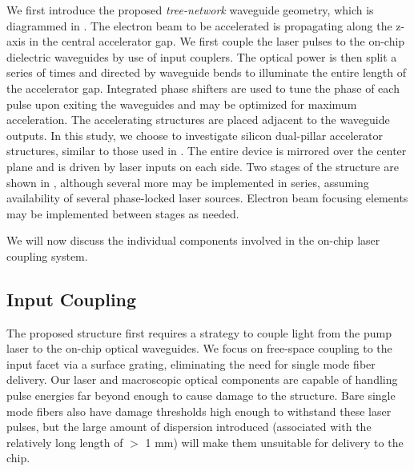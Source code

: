 
We first introduce the proposed \textit{tree-network} waveguide geometry, which is diagrammed in .
The electron beam to be accelerated is propagating along the z-axis in the central accelerator gap.
We first couple the laser pulses to the on-chip dielectric waveguides by use of input couplers.
The optical power is then split a series of times and directed by waveguide bends to illuminate the entire length of the accelerator gap.
Integrated phase shifters are used to tune the phase of each pulse upon exiting the waveguides and may be optimized for maximum acceleration.
The accelerating structures are placed adjacent to the waveguide outputs.
In this study, we choose to investigate silicon dual-pillar accelerator structures, similar to those used in \cite{leedle2015dielectric}.
The entire device is mirrored over the center plane and is driven by laser inputs on each side.
Two stages of the structure are shown in , although several more may be implemented in series, assuming availability of several phase-locked laser sources.
Electron beam focusing elements may be implemented between stages as needed.

We will now discuss the individual components involved in the on-chip laser coupling system.

\subsection{Input Coupling}
The proposed structure first requires a strategy to couple light from the pump laser to the on-chip optical waveguides.
We focus on free-space coupling to the input facet via a surface grating, eliminating the need for single mode fiber delivery.
Our laser and macroscopic optical components are capable of handling pulse energies far beyond enough to cause damage to the structure.
Bare single mode fibers also have damage thresholds high enough to withstand these laser pulses, but the large amount of dispersion introduced (associated with the relatively long length of $>$ 1 mm) will make them unsuitable for delivery to the chip.
 

